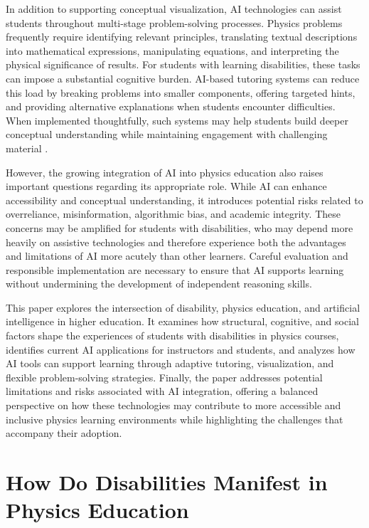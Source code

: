 \documentclass[]{aastex701}
\begin{document}
In addition to supporting conceptual visualization, AI technologies can assist students throughout multi-stage problem-solving processes. Physics problems frequently require identifying relevant principles, translating textual descriptions into mathematical expressions, manipulating equations, and interpreting the physical significance of results. For students with learning disabilities, these tasks can impose a substantial cognitive burden. AI-based tutoring systems can reduce this load by breaking problems into smaller components, offering targeted hints, and providing alternative explanations when students encounter difficulties. When implemented thoughtfully, such systems may help students build deeper conceptual understanding while maintaining engagement with challenging material \citep{Paglialunga2025, Sweller2011}.

However, the growing integration of AI into physics education also raises important questions regarding its appropriate role. While AI can enhance accessibility and conceptual understanding, it introduces potential risks related to overreliance, misinformation, algorithmic bias, and academic integrity. These concerns may be amplified for students with disabilities, who may depend more heavily on assistive technologies and therefore experience both the advantages and limitations of AI more acutely than other learners. Careful evaluation and responsible implementation are necessary to ensure that AI supports learning without undermining the development of independent reasoning skills.

This paper explores the intersection of disability, physics education, and artificial intelligence in higher education. It examines how structural, cognitive, and social factors shape the experiences of students with disabilities in physics courses, identifies current AI applications for instructors and students, and analyzes how AI tools can support learning through adaptive tutoring, visualization, and flexible problem-solving strategies. Finally, the paper addresses potential limitations and risks associated with AI integration, offering a balanced perspective on how these technologies may contribute to more accessible and inclusive physics learning environments while highlighting the challenges that accompany their adoption.



\section{How Do Disabilities Manifest in Physics Education}
\end{document}
